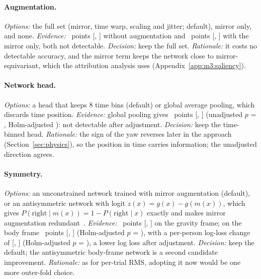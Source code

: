 \paragraph{Augmentation.}
\emph{Options:} the full set (mirror, time warp, scaling and jitter; default), mirror only, and none.
\emph{Evidence:} ~points [, ] without augmentation and ~points [, ] with the mirror only, both not detectable.
\emph{Decision:} keep the full set.
\emph{Rationale:} it costs no detectable accuracy, and the mirror term keeps the network close to mirror-equivariant, which the attribution analysis uses (Appendix~\ref{app:m3:saliency}).

\paragraph{Network head.}
\emph{Options:} a head that keeps 8 time bins (default) or global average pooling, which discards time position.
\emph{Evidence:} global pooling gives ~points [, ] (unadjusted $p$ = , Holm-adjusted ): not detectable after adjustment.
\emph{Decision:} keep the time-binned head.
\emph{Rationale:} the sign of the yaw reverses later in the approach (Section~\ref{sec:physics}), so the position in time carries information; the unadjusted direction agrees.

\paragraph{Symmetry.}
\emph{Options:} an unconstrained network trained with mirror augmentation (default), or an antisymmetric network with logit $z(x) = g(x) - g(m(x))$, which gives $P(\mathrm{right}\mid m(x)) = 1 - P(\mathrm{right}\mid x)$ exactly and makes mirror augmentation redundant~\cite{cohen2016group,puny2022frame}.
\emph{Evidence:} ~points [, ] on the gravity frame; on the body frame ~points [, ] (Holm-adjusted $p$ = ), with a per-person log-loss change of  [, ] (Holm-adjusted $p$ = ), a lower log loss after adjustment.
\emph{Decision:} keep the default; the antisymmetric body-frame network is a second candidate improvement.
\emph{Rationale:} as for per-trial RMS, adopting it now would be one more outer-fold choice.

